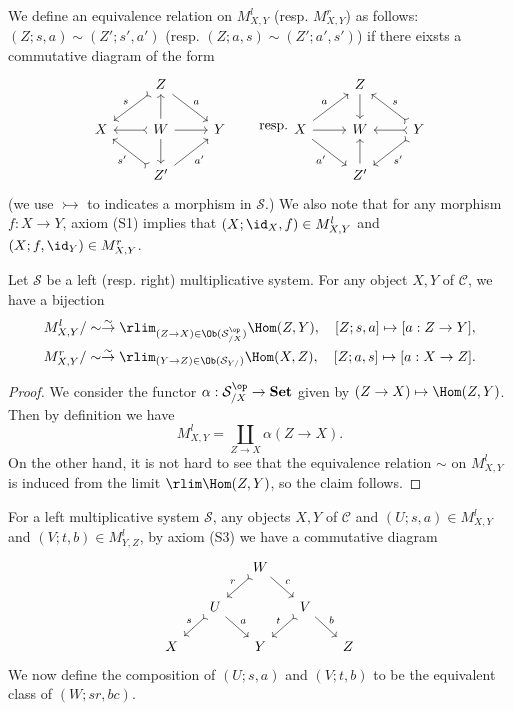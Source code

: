 We define an equivalence relation on $M_{X,Y}^l$ (resp. $M_{X,Y}^r$) as follows: $(Z;s,a)\sim(Z';s',a')$ (resp. $(Z;a,s)\sim(Z';a',s')$) if there eixsts a commutative diagram of the form
\[\begin{tikzcd}
&Z\ar[ld,swap,"s",tail]\ar[rd,"a"]\\
X&W\ar[l,tail]\ar[r]\ar[u]\ar[d]&Y\\
&Z'\ar[lu,"s'",tail]\ar[ru,swap,"a'"]&
\end{tikzcd}\quad\quad \text{resp.}
\begin{tikzcd}
&Z\ar[d]\\
X\ar[ru,"a"]\ar[rd,swap,"a'"]\ar[r]&W&Y\ar[ld,"s'",tail]\ar[l,tail]\ar[lu,swap,"s",tail]\\
&Z'\ar[u]&
\end{tikzcd}\]
(we use $\rightarrowtail$ to indicates a morphism in $\mathcal{S}$.) We also note that for any morphism $f:X\to Y$, axiom (S1) implies that $(X;\id_X,f)\in M_{X,Y}^l$ and $(X;f,\id_Y)\in M_{X,Y}^r$.

\begin{lemma}\label{category localization Hom set char by colim}
Let $\mathcal{S}$ be a left (resp. right) multiplicative system. For any object $X,Y$ of $\mathcal{C}$, we have a bijection
\begin{gather*}
M_{X,Y}^l/\sim \stackrel{\sim}{\to} \rlim_{(Z\to X)\in\Ob(\mathcal{S}_{/X}^{\op})}\Hom(Z,Y),\quad [Z;s,a]\mapsto [a:Z\to Y],\\
M_{X,Y}^r/\sim \stackrel{\sim}{\to} \rlim_{(Y\to Z)\in\Ob(\mathcal{S}_{Y/})}\Hom(X,Z),\quad [Z;a,s]\mapsto [a:X\to Z].
\end{gather*}
\end{lemma}
\begin{proof}
We consider the functor $\alpha:\mathcal{S}_{/X}^{\op}\to\mathbf{Set}$ given by $(Z\to X)\mapsto\Hom(Z,Y)$. Then by definition we have
\[M_{X,Y}^l=\coprod_{Z\to X}\alpha(Z\to X).\]
On the other hand, it is not hard to see that the equivalence relation $\sim$ on $M_{X,Y}^l$ is induced from the limit $\rlim\Hom(Z,Y)$, so the claim follows.
\end{proof}

For a left multiplicative system $\mathcal{S}$, any objects $X,Y$ of $\mathcal{C}$ and $(U;s,a)\in M_{X,Y}^l$ and $(V;t,b)\in M_{Y,Z}^l$, by axiom (S3) we have a commutative diagram
\begin{equation}\label{category localization composition law def}
\begin{tikzcd}[row sep=5mm, column sep=5mm]
&&W\ar[ld,swap,"r",tail]\ar[rd,"c"]&&\\
&U\ar[ld,swap,"s",tail]\ar[rd,"a"]&&V\ar[ld,swap,"t",tail]\ar[rd,"b"]&\\
X&&Y&&Z
\end{tikzcd}
\end{equation}
We now define the composition of $(U;s,a)$ and $(V;t,b)$ to be the equivalent class of $(W;sr,bc)$.


